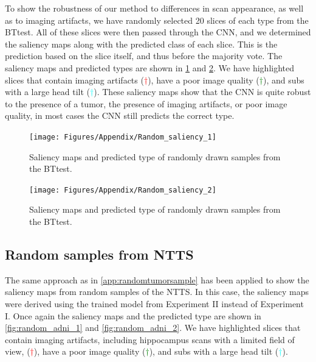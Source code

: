 \begin{subappendices}
To show the robustness of our method to differences in \gls{scan} appearance, as well as to imaging artifacts, we have randomly selected 20 \glspl{slice} of each \gls{type} from the \gls{BTtest}.
All of these \glspl{slice} were then passed through the \gls{CNN}, and we determined the saliency maps along with the predicted \gls{class} of each \gls{slice}.
This is the prediction based on the \gls{slice} itself, and thus before the majority vote.
The saliency maps and predicted \glspl{type} are shown in \cref{fig:random_1} and \cref{fig:random_2}.
We have highlighted \glspl{slice} that contain imaging artifacts (\textcolor{red}{$\dagger$}), have a poor image quality (\textcolor{green}{$\dagger$}), and \glspl{sub} with a large head tilt  (\textcolor{cyan}{$\dagger$}).
These saliency maps show that the \gls{CNN} is quite robust to the presence of a tumor, the presence of imaging artifacts, or poor image quality, in most cases the \gls{CNN} still predicts the correct \gls{type}.
%

\begin{figure}[ht]
    \centering
    \texttt{[image: Figures/Appendix/Random\_saliency\_1]}

    \caption{Saliency maps and predicted \gls{type} of randomly drawn \glspl{sample} from the \gls{BTtest}.}
    \label{fig:random_1}
\end{figure}

\begin{figure}[ht]
    \centering
    \texttt{[image: Figures/Appendix/Random\_saliency\_2]}

    \caption{Saliency maps and predicted \gls{type} of randomly drawn \glspl{sample} from the \gls{BTtest}.}
    \label{fig:random_2}
\end{figure}


\clearpage

\subsection{Random samples from \gls{NTTS}}
The same approach as in \cref{app:randomtumorsample} has been applied to show the saliency maps from random samples of the \gls{NTTS}.
In this case, the saliency maps were derived using the trained model from Experiment II instead of Experiment I.
Once again the saliency maps and the predicted \gls{type} are shown in \cref{fig:random_adni_1} and \cref{fig:random_adni_2}.
We have highlighted \glspl{slice} that contain imaging artifacts, including hippocampus \glspl{scan} with a limited field of view, (\textcolor{red}{$\dagger$}), have a poor image quality (\textcolor{green}{$\dagger$}), and \glspl{sub} with a large head tilt (\textcolor{cyan}{$\dagger$}).



\end{subappendices}
